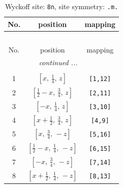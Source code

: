 \documentclass[fleqn,8pt]{jsarticle}
\begin{document}
\begin{longtable}{ccc}
\caption{Wyckoff site: {\tt 8n}, site symmetry: {\tt .m.}}
 \\
 \hline \hline
No. & position & mapping \\ \hline \endfirsthead

\multicolumn{2}{l}{\tablename\ \thetable{}} \\
 \hline \hline
No. & position & mapping \\ \hline \endhead

 \hline \hline
\multicolumn{2}{r}{\footnotesize\it continued ...} \\ \endfoot

 \hline \hline
\multicolumn{2}{r}{} \\ \endlastfoot

1 & $\left[ x,\, \frac{1}{4},\, z \right]$ & {\tt [1,12]} \\ \hline
2 & $\left[ \frac{1}{2} - x,\, \frac{3}{4},\, z \right]$ & {\tt [2,11]} \\ \hline
3 & $\left[ - x,\, \frac{1}{4},\, z \right]$ & {\tt [3,10]} \\ \hline
4 & $\left[ x + \frac{1}{2},\, \frac{3}{4},\, z \right]$ & {\tt [4,9]} \\ \hline
5 & $\left[ x,\, \frac{3}{4},\, - z \right]$ & {\tt [5,16]} \\ \hline
6 & $\left[ \frac{1}{2} - x,\, \frac{1}{4},\, - z \right]$ & {\tt [6,15]} \\ \hline
7 & $\left[ - x,\, \frac{3}{4},\, - z \right]$ & {\tt [7,14]} \\ \hline
8 & $\left[ x + \frac{1}{2},\, \frac{1}{4},\, - z \right]$ & {\tt [8,13]} \\
\end{longtable}
\renewcommand{\arraystretch}{1.2}
\end{document}
